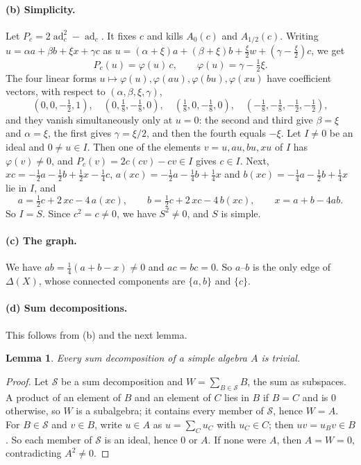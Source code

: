 \documentclass[11pt]{article}
\newtheorem{lemma}{Lemma}[section]
\theoremstyle{definition}
\theoremstyle{remark}
\newcommand{\ad}{\operatorname{ad}}
\newcommand{\half}{\tfrac12}
\begin{document}
\paragraph{(b) Simplicity.}
Let $P_c=2\ad_c^2-\ad_c$. It fixes $c$ and kills $A_0(c)$ and $A_{1/2}(c)$.
Writing $u=\alpha a+\beta b+\xi x+\gamma c$ as
$u=(\alpha+\xi)a+(\beta+\xi)b+\frac\xi2w+(\gamma-\frac\xi2)c$, we get
\[
P_c(u)=\varphi(u)\,c,\qquad \varphi(u)=\gamma-\tfrac12\xi .
\]
The four linear forms $u\mapsto\varphi(u),\varphi(au),\varphi(bu),\varphi(xu)$
have coefficient vectors, with respect to $(\alpha,\beta,\xi,\gamma)$,
\[
(0,0,-\tfrac12,1),\quad(0,\tfrac18,-\tfrac18,0),\quad(\tfrac18,0,-\tfrac18,0),
\quad(-\tfrac18,-\tfrac18,-\tfrac12,-\tfrac12),
\]
and they vanish simultaneously only at $u=0$: the second and third give
$\beta=\xi$ and $\alpha=\xi$, the first gives $\gamma=\xi/2$, and then
the fourth equals $-\xi$. Let $I\ne0$ be an ideal and
$0\ne u\in I$. Then one of the elements $v=u,au,bu,xu$ of $I$ has
$\varphi(v)\ne0$, and $P_c(v)=2c(cv)-cv\in I$ gives $c\in I$. Next,
$xc=-\half a-\half b+\half x-\frac14c$, $a(xc)=-\half a-\frac14b+\frac14x$
and $b(xc)=-\frac14a-\half b+\frac14x$ lie in $I$, and
\[
a=\tfrac12c+2\,xc-4\,a(xc),\qquad b=\tfrac12c+2\,xc-4\,b(xc),\qquad
x=a+b-4ab .
\]
So $I=S$. Since $c^2=c\ne0$, we have $S^2\ne0$, and $S$ is simple.

\paragraph{(c) The graph.}
We have $ab=\frac14(a+b-x)\ne0$ and $ac=bc=0$. So $a$--$b$ is the only
edge of $\Delta(X)$, whose connected components are $\{a,b\}$ and $\{c\}$.

\paragraph{(d) Sum decompositions.}
This follows from (b) and the next lemma.

\begin{lemma}\label{lem:sumdec}
Every sum decomposition of a simple algebra $A$ is trivial.
\end{lemma}

\begin{proof}
Let $\mathcal S$ be a sum decomposition and $W=\sum_{B\in\mathcal S}B$, the
sum as subspaces. A product of an element of $B$ and an element of $C$ lies
in $B$ if $B=C$ and is $0$ otherwise, so $W$ is a subalgebra; it contains
every member of $\mathcal S$, hence $W=A$. For $B\in\mathcal S$ and $v\in B$,
write $u\in A$ as $u=\sum_Cu_C$ with $u_C\in C$; then $uv=u_Bv\in B$. So each
member of $\mathcal S$ is an ideal, hence $0$ or $A$. If none were $A$, then
$A=W=0$, contradicting $A^2\ne0$.
\end{proof}
\end{document}
